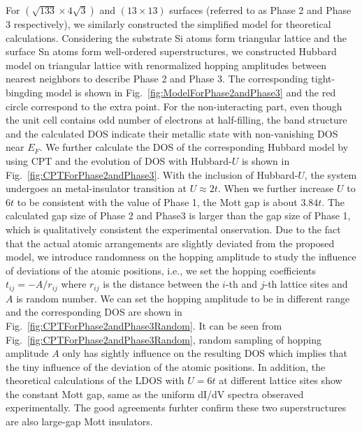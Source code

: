 \documentclass[aps,prb,amsfonts,amsmath,amssymb,showpacs,groupedaddress,superscriptaddress]{revtex4-1}
\begin{document}
For $(\sqrt{133} \times 4\sqrt{3})$ and $(13 \times 13)$ surfaces (referred to as Phase 2 and Phase 3 respectively), we similarly constructed the simplified model for theoretical calculations. Considering the substrate Si atoms form triangular lattice and the surface Sn atoms form well-ordered superstructures, we constructed Hubbard model on triangular lattice with renormalized hopping amplitudes between nearest neighbors to describe Phase 2 and Phase 3. The corresponding tight-bingding model is shown in Fig.~\ref{fig:ModelForPhase2andPhase3} and the red circle correspond to the extra point. For the non-interacting part, even though the unit cell contains odd number of electrons at half-filling, the band structure and the calculated DOS indicate their metallic state with non-vanishing DOS near $E_{F}$. We further calculate the DOS of the corresponding Hubbard model by using CPT and the evolution of DOS with Hubbard-$U$ is shown in Fig.~\ref{fig:CPTForPhase2andPhase3}. With the inclusion of Hubbard-$U$, the system undergoes an metal-insulator transition at $U \approx 2t$. When we further increase $U$ to $6t$ to be consistent with the value of Phase 1, the Mott gap is about $3.84t$. The calculated gap size of
Phase 2 and Phase3 is larger than the gap size of Phase 1, which is qualitatively consistent the experimental onservation. Due to the fact that the actual atomic arrangements are slightly deviated from the proposed model, we introduce randomness on the hopping amplitude to study the influence of deviations of the atomic positions, i.e., we set the hopping coefficients $t_{ij} = -A / r_{ij}$ where $r_{ij}$ is the distance between the $i$-th and $j$-th lattice sites and $A$ is random number. We can set the hopping amplitude to be in different range and the corresponding DOS are shown in Fig.~\ref{fig:CPTForPhase2andPhase3Random}. It can be seen from Fig.~\ref{fig:CPTForPhase2andPhase3Random}, random sampling of hopping amplitude $A$ only has sightly influence on the resulting DOS which implies that the tiny influence of the deviation of the atomic positions. In addition, the theoretical calculations of the LDOS with $U = 6t$ at different lattice sites show the constant Mott gap, same as the uniform dI/dV spectra obseraved experimentally. The good agreements furhter confirm these two superstructures are also large-gap Mott insulators.
\end{document}
